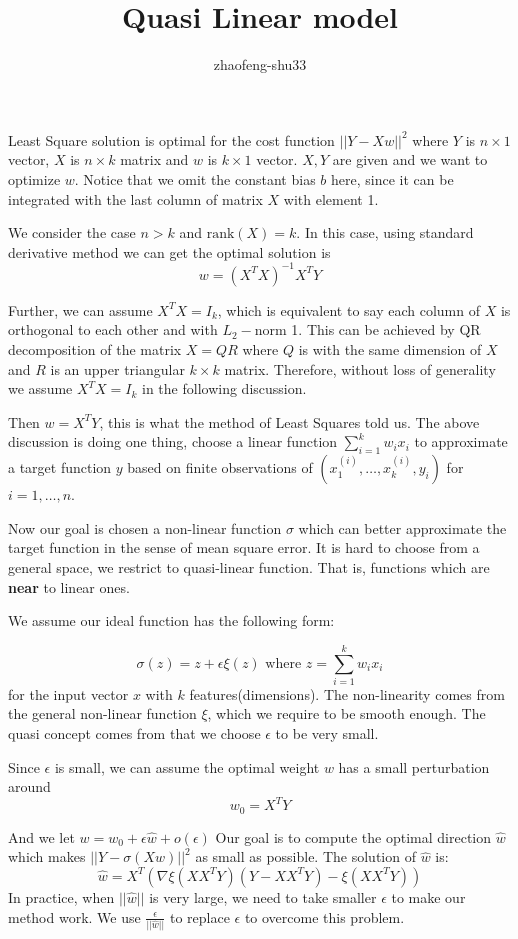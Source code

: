 \documentclass{article}
\title{Quasi Linear model}
\author{zhaofeng-shu33}
\begin{document}
	\maketitle
Least Square solution is optimal for the cost function $||Y-Xw||^2$ where $Y$ is $n\times 1$ vector,
$X$ is $n\times k$ matrix and $w$ is $k\times 1$ vector. $X,Y$ are given and we want to optimize $w$.
Notice that we omit the constant bias $b$ here, since it can be integrated with the last column of matrix $X$ with element 1.

We consider the case $n > k$ and $\textrm{rank}(X) = k$. In this case, using standard derivative method we can get
the optimal solution is
$$
w = (X^TX)^{-1} X^T Y
$$

Further, we can assume $X^TX=I_k$, which is equivalent to say each column of $X$ is orthogonal to each other and with $L_2-$norm 1.
This can be achieved by QR decomposition of the matrix $X=QR$ where $Q$ is with the same dimension of $X$ and $R$ is an upper triangular 
$k\times k$ matrix. Therefore, without loss of generality we assume $X^TX=I_k$ in the following discussion.

Then $w=X^T Y$, this is what the method of Least Squares told us. The above discussion is doing one thing, choose a linear function $\sum_{i=1}^k w_i x_i$
to approximate a target function $y$ based on finite observations of $(x^{(i)}_1,\dots, x^{(i)}_k, y_i)$ for $i=1,\dots, n$.

Now our goal is chosen a non-linear function $\sigma$ which can better approximate the target function in the sense of mean square error.
It is hard to choose from a general space, we restrict to quasi-linear function. That is, functions which are \textbf{near} to 
linear ones.

We assume our ideal function has the following form:

$$
\sigma(z) = z + \epsilon \xi(z) \textrm{ where } z = \sum_{i=1}^k w_i x_i
$$
for the input vector $x$ with $k$ features(dimensions).
The non-linearity comes from the general non-linear function $\xi$, which we require to be smooth enough.
The quasi concept comes from that we choose $\epsilon$ to be very small.

Since $\epsilon$ is small, we can assume the optimal weight $w$ has a small perturbation around
\begin{equation}\label{eq:W_0}
w_0 = X^T Y
\end{equation}


And we let $w=w_0 + \epsilon \hat{w} + o(\epsilon)$ Our goal is to compute the optimal direction $\hat{w}$ which makes
$||Y-\sigma(Xw)||^2$ as small as possible.
The solution of $\hat{w}$ is:
\begin{equation}\label{eq:W_hat}
\hat{w} = X^T\left(\nabla \xi(XX^TY)(Y-XX^TY) - \xi(XX^TY)
\right)
\end{equation}
In practice, when $||\hat{w}||$ is very large, we need to take smaller $\epsilon$ to make our method work. We use 
$\frac{\epsilon}{||\hat{w}||} $ to replace $\epsilon$ to overcome this problem.
\end{document}
